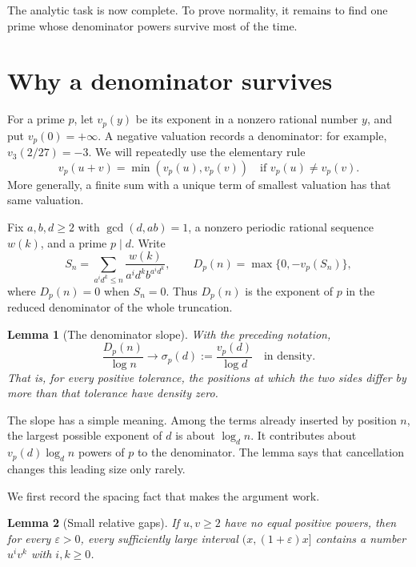 \documentclass[11pt]{article}
\newtheorem{lemma}{Lemma}
\begin{document}
The analytic task is now complete. To prove normality, it remains to
find one prime whose denominator powers survive most of the time.

\section{Why a denominator survives}

For a prime \(p\), let \(v_p(y)\) be its exponent in a nonzero
rational number \(y\), and put \(v_p(0)=+\infty\). A negative
valuation records a denominator: for example, \(v_3(2/27)=-3\).
We will repeatedly use the elementary rule
\begin{equation}\label{eq:valuation-rule}
 v_p(u+v)=\min(v_p(u),v_p(v))
 \quad\text{if }v_p(u)\ne v_p(v).
\end{equation}
More generally, a finite sum with a unique term of smallest valuation
has that same valuation.

Fix \(a,b,d\ge2\) with \(\gcd(d,ab)=1\), a nonzero periodic
rational sequence \(w(k)\), and a prime \(p\mid d\). Write
\begin{equation}\label{eq:block}
 S_n=\sum_{a^i d^k\le n}\frac{w(k)}{a^i d^k b^{a^i d^k}},
 \qquad D_p(n)=\max\{0,-v_p(S_n)\},
\end{equation}
where \(D_p(n)=0\) when \(S_n=0\). Thus \(D_p(n)\) is the exponent
of \(p\) in the reduced denominator of the whole truncation.

\begin{lemma}[The denominator slope]\label{lem:slope}
With the preceding notation,
\begin{equation}\label{eq:slope}
 \frac{D_p(n)}{\log n}\longrightarrow
 \sigma_p(d):=\frac{v_p(d)}{\log d}
 \quad\text{in density}.
\end{equation}
That is, for every positive tolerance, the positions at which the two
sides differ by more than that tolerance have density zero.
\end{lemma}

The slope has a simple meaning. Among the terms already inserted by
position \(n\), the largest possible exponent of \(d\) is about
\(\log_d n\). It contributes about
\(v_p(d)\log_d n\) powers of \(p\) to the denominator. The lemma
says that cancellation changes this leading size only rarely.

We first record the spacing fact that makes the argument work.

\begin{lemma}[Small relative gaps]\label{lem:gaps}
If \(u,v\ge2\) have no equal positive powers, then for every
\(\varepsilon>0\), every sufficiently large interval
\((x,(1+\varepsilon)x]\) contains a number \(u^i v^k\) with
\(i,k\ge0\).
\end{lemma}
\end{document}
